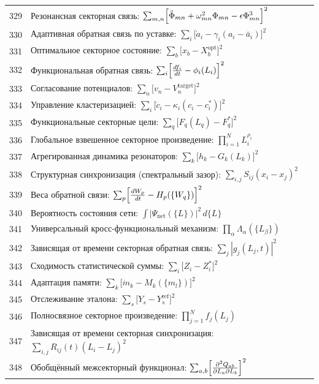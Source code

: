 \documentclass[12pt,a4paper]{article}
\begin{document}
\begin{longtable}{r l}
		329 & Резонансная секторная связь: $\sum_{m,n}\Bigl[\ddot\Phi_{mn} + \omega_{mn}^2\Phi_{mn} - \epsilon\Phi_{mn}^3\Bigr]^2$ \\
		330 & Адаптивная обратная связь по уставке: $\sum_i\bigl[\dot a_i - \gamma_i(a_i - \bar a_i)\bigr]^2$ \\
		331 & Оптимальное секторное состояние: $\sum_b\bigl[x_b - X_b^{\text{opt}}\bigr]^2$ \\
		332 & Функциональная обратная связь: $\sum_i\Bigl[\frac{df_i}{dt} - \phi_i(L_i)\Bigr]^2$ \\
		333 & Согласование потенциалов: $\sum_n\bigl[v_n - V_n^{\text{target}}\bigr]^2$ \\
		334 & Управление кластеризацией: $\sum_i\bigl[\dot c_i - \kappa_i(c_i - c_i^*)\bigr]^2$ \\
		335 & Функциональные секторные цели: $\sum_q\bigl[F_q(L_q) - F_q^*\bigr]^2$ \\
		336 & Глобальное взвешенное секторное произведение: $\prod_{i=1}^N L_i^{\rho_i}$ \\
		337 & Агрегированная динамика резонаторов: $\sum_k\bigl[h_k - G_k(L_k)\bigr]^2$ \\
		338 & Структурная синхронизация (спектральный зазор): $\sum_{i,j}S_{ij}(x_i - x_j)^2$ \\
		339 & Веса обратной связи: $\sum_p\Bigl[\frac{dW_p}{dt} - H_p(\{W_q\})\Bigr]^2$ \\
		340 & Вероятность состояния сети: $\int|\Psi_{\text{net}}(\{L\})|^2\,d\{L\}$ \\
		341 & Универсальный кросс-функциональный механизм: $\prod_\alpha\Lambda_\alpha(\{L_\beta\})$ \\
		342 & Зависящая от времени секторная обратная связь: $\sum_j|g_j(L_j,t)|^2$ \\
		343 & Сходимость статистической суммы: $\sum_i\bigl[Z_i - Z_i^*\bigr]^2$ \\
		344 & Адаптация памяти: $\sum_k\bigl[\dot m_k - M_k(\{m_l\})\bigr]^2$ \\
		345 & Отслеживание эталона: $\sum_s\bigl[Y_s - Y_s^{\text{ref}}\bigr]^2$ \\
		346 & Полносвязное секторное произведение: $\prod_{j=1}^N f_j(L_j)$ \\
		347 & Зависящая от времени секторная синхронизация: $\sum_{i,j}R_{ij}(t)(L_i - L_j)^2$ \\
		348 & Обобщённый межсекторный функционал: $\sum_{a,b}\Bigl[\frac{\partial^2 Q_{ab}}{\partial L_a\partial L_b}\Bigr]^2$ \\

\end{longtable}
\end{document}
